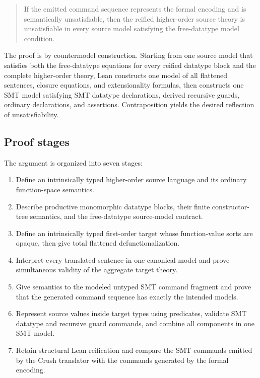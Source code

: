 \documentclass[11pt]{article}
\theoremstyle{remark}
\begin{document}
\begin{quote}
If the emitted command sequence represents the formal encoding and is
semantically unsatisfiable, then
the reified higher-order source theory is unsatisfiable in every source model
satisfying the free-datatype model condition.
\end{quote}

The proof is by countermodel construction. Starting from one source model that
satisfies both the free-datatype equations for every reified datatype block and
the complete higher-order theory, Lean constructs one model of all flattened
sentences, closure equations, and extensionality formulas, then constructs one
SMT model
satisfying SMT datatype declarations, derived recursive guards, ordinary
declarations, and assertions. Contraposition yields the desired reflection of
unsatisfiability.

\subsection{Proof stages}

The argument is organized into seven stages:
\begin{enumerate}[leftmargin=*,label=\arabic*.]
  \item Define an intrinsically typed higher-order source language and its
        ordinary function-space semantics.
  \item Describe productive monomorphic datatype blocks, their finite
        constructor-tree semantics, and the free-datatype source-model contract.
  \item Define an intrinsically typed first-order target whose function-value
        sorts are opaque, then give total flattened defunctionalization.
  \item Interpret every translated sentence in one canonical model and prove
        simultaneous validity of the aggregate target theory.
  \item Give semantics to the modeled untyped SMT command fragment and prove
        that the generated command sequence has exactly the intended models.
  \item Represent source values inside target types using predicates, validate
        SMT datatype and recursive guard commands, and combine all
        components in one SMT model.
  \item Retain structural Lean reification and compare the SMT commands emitted
        by the Crush translator with the commands generated by the formal encoding.
\end{enumerate}
\end{document}
